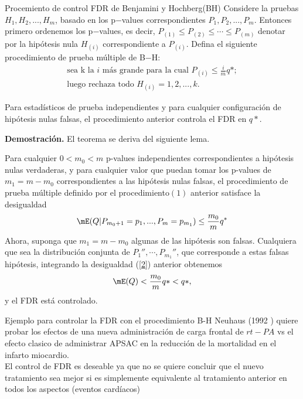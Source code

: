\begin{frame}{Procemiento de control FDR de Benjamini y Hochberg(BH)}
    Considere la pruebas $H_1, H_2, ..., H_m$, basado en los p$-$values correspondientes $P_{1}, P_{2},..., P_{m}$. Entonces primero ordenemos los p$-$values, es decir, $P_{(1)}\leq P_{(2)}\leq \cdots \leq  P_{(m)}$ denotar por la hipótesis nula $H_{(i)}$ correspondiente a $P_{(i)}$. Defina el siguiente procedimiento de prueba múltiple de B$-$H:\\
\begin{align}
 \nonumber\text{sea k la $i$ más grande para la cual }P_{(i)}\leq \frac{i}{m}q*;\\
 \text{luego rechaza todo }H_{(i)} = 1, 2, ..., k.
\end{align} 
\end{frame}

\begin{frame}
    \begin{thh} \label{t_1}
Para estadísticos de prueba independientes y para cualquier configuración de hipótesis nulas falsas, el procedimiento anterior controla el FDR en $q*$.
    \end{thh}
\textbf{Demostración.} El teorema se deriva del siguiente lema.
\end{frame}

\begin{frame}
    \begin{lm} \label{l_1}
Para cualquier $0 <m_0 <m$ p-values independientes correspondientes a hipótesis nulas verdaderas, y para cualquier valor que puedan tomar los p-values de $m_1= m - m_0$ correspondientes a las hipótesis nulas falsas, el procedimiento de prueba múltiple definido por el procedimiento$(1)$ anterior satisface la desigualdad
\begin{equation}\label{2}
\mE (Q | P_{m_0+1}=p_1, ..., P_m = p_{m_1})\leq \frac{m_0}{m} q^*
\end{equation}
Ahora, suponga que $m_1=m-m_0$ algunas de las hipótesis son falsas. Cualquiera que sea la distribución conjunta de $P_1'' ,\cdots, P_{m_1}''$, que corresponde a estas falsas hipótesis, integrando la desigualdad (\ref{2}) anterior obtenemos
\begin{equation*}
\mE(Q) <\frac{m_0}{m}q* <q *,
\end{equation*}
y el FDR está controlado.
    \end{lm}
\end{frame}
\begin{frame}{Ejemplo para controlar la FDR con el procedimiento B-H}
    Neuhaus (1992 ) quiere probar los efectos de una nueva administración de carga frontal de $rt-PA$ vs el efecto clasico de administrar APSAC en la reducción de la mortalidad en el infarto miocardio.  \\
    
    El control de FDR es deseable ya que no se quiere concluir que el nuevo tratamiento sea mejor si es simplemente equivalente al tratamiento anterior en todos los aspectos (eventos cardíacos)
\end{frame}

